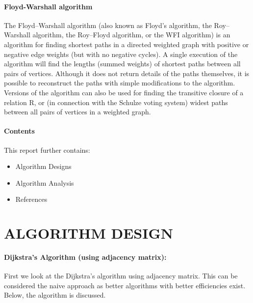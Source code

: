 \documentclass[10pt]{article}
\begin{document}
\begin{multicols*}{2}
\paragraph{Floyd-Warshall algorithm}
The Floyd–Warshall algorithm (also known as Floyd's algorithm, the Roy–Warshall algorithm, the Roy–Floyd algorithm, or the WFI algorithm) is an algorithm for finding shortest paths in a directed weighted graph with positive or negative edge weights (but with no negative cycles). A single execution of the algorithm will find the lengths (summed weights) of shortest paths between all pairs of vertices. Although it does not return details of the paths themselves, it is possible to reconstruct the paths with simple modifications to the algorithm. Versions of the algorithm can also be used for finding the transitive closure of a relation R, or (in connection with the Schulze voting system) widest paths between all pairs of vertices in a weighted graph.

\paragraph{Contents}
This report further contains:
\begin{itemize}
\item 	Algorithm  Designs
\item 	Algorithm  Analysis
\item 	References
\end{itemize}

\newpage

\section*{ALGORITHM DESIGN}

\paragraph{Dijkstra's Algorithm (using adjacency matrix):}
First we look at the Dijkstra's algorithm using adjacency matrix. This can be considered the naive approach as better algorithms with better efficiencies exist. Below, the algorithm is discussed.\\



\end{multicols*}
\end{document}
